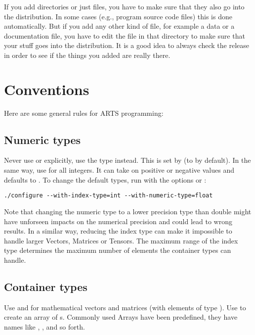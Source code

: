 If you add directories or just files, you have to make sure that they
also go into the distribution. In some cases (e.g., program source
code files) this is done automatically. But if you add any other kind
of file, for example a data or a documentation file, you have to edit
the  file in that directory to make sure that your
stuff goes into the distribution. It is a good idea to always check
the release in order to see if the things you added are really there.

\section{Conventions}

Here are some general rules for ARTS programming:

\subsection{Numeric types} Never use  or
 explicitly, use the type  instead.
This is set by  (to  by default).
In the same way, use  for all integers. It can take on
positive or negative values and defaults to .
To change the default types, run  with the options
 or :

{\small
\begin{verbatim}
./configure --with-index-type=int --with-numeric-type=float
\end{verbatim}
}

Note that changing the numeric type to a lower precision type than
double might have unforseen impacts on the numerical precision and could
lead to wrong results. In a similar way, reducing the index type can
make it impossible to handle larger Vectors, Matrices or Tensors. The
maximum range of the index type determines the maximum number of
elements the container types can handle.

\subsection{Container types} Use  and
 for mathematical vectors and matrices (with elements
of type ). Use  to
create an array of s.
Commonly used Arrays have been predefined, they have names like
, , and so forth.

